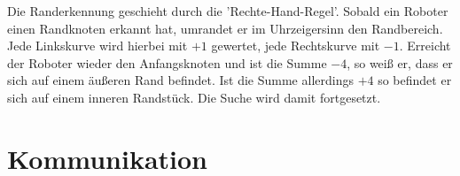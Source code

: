 \documentclass[10pt,a4paper]{article}
\let\oldsection\section
\renewcommand{\section}{\newpage \oldsection}
\begin{document}
			Die Randerkennung geschieht durch die 'Rechte-Hand-Regel'. Sobald ein Roboter einen Randknoten erkannt hat, umrandet er im
			Uhrzeigersinn den Randbereich. Jede Linkskurve wird hierbei mit $+1$ gewertet, jede Rechtskurve mit $-1$. Erreicht der Roboter wieder
			den Anfangsknoten und ist die Summe $-4$, so weiß er, dass er sich auf einem äußeren Rand befindet. Ist die Summe allerdings $+4$
			so befindet er sich auf einem inneren Randstück. Die Suche wird damit fortgesetzt.	
	\section{Kommunikation}
				
	\newpage	
	\printglossary[style=altlist,title=Glossar]
						
\end{document}
